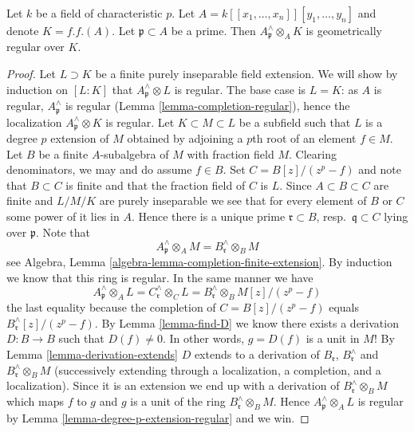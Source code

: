 \begin{lemma}
\label{lemma-helper-G-ring}
Let $k$ be a field of characteristic $p$.
Let $A = k[[x_1, \ldots, x_n]][y_1, \ldots, y_n]$ and denote $K = f.f.(A)$.
Let $\mathfrak p \subset A$ be a prime. Then
$A_\mathfrak p^\wedge \otimes_A K$ is geometrically regular over $K$.
\end{lemma}

\begin{proof}
Let $L \supset K$ be a finite purely inseparable field extension.
We will show by induction on $[L : K]$ that $A_\mathfrak p^\wedge \otimes L$
is regular. The base case is $L = K$: as $A$ is regular,
$A_\mathfrak p^\wedge$ is regular (Lemma \ref{lemma-completion-regular}),
hence the localization $A_\mathfrak p^\wedge \otimes K$ is regular.
Let $K \subset M \subset L$ be a subfield such that
$L$ is a degree $p$ extension of $M$ obtained by adjoining a $p$th root
of an element $f \in M$. Let $B$ be a finite $A$-subalgebra
of $M$ with fraction field $M$. Clearing denominators, we may and do assume
$f \in B$. Set $C = B[z]/(z^p -f)$ and note that $B \subset C$
is finite and that the fraction field of $C$ is $L$. Since
$A \subset B \subset C$ are finite and $L/M/K$ are purely
inseparable we see that for every element of $B$ or $C$ some power of
it lies in $A$. Hence there is a unique prime $\mathfrak r \subset B$,
resp.\ $\mathfrak q \subset C$ lying over $\mathfrak p$. Note that
$$
A_\mathfrak p^\wedge \otimes_A M = B_\mathfrak r^\wedge \otimes_B M
$$
see Algebra, Lemma \ref{algebra-lemma-completion-finite-extension}.
By induction we know that this ring is regular. In the same manner we have
$$
A_\mathfrak p^\wedge \otimes_A L =
C_\mathfrak r^\wedge \otimes_C L =
B_\mathfrak r^\wedge \otimes_B M[z]/(z^p - f)
$$
the last equality because the completion of
$C = B[z]/(z^p - f)$ equals $B_\mathfrak r^\wedge[z]/(z^p -f)$.
By Lemma \ref{lemma-find-D} we know there exists a derivation
$D : B \to B$ such that $D(f) \not = 0$. In other words, $g = D(f)$
is a unit in $M$! By Lemma \ref{lemma-derivation-extends}
$D$ extends to a derivation of $B_\mathfrak r$, $B_\mathfrak r^\wedge$
and $B_\mathfrak r^\wedge \otimes_B M$ (successively extending through a
localization, a completion, and a localization). Since it is an
extension we end up with a derivation of $B_\mathfrak r^\wedge \otimes_B M$
which maps $f$ to $g$ and $g$ is a unit of the ring
$B_\mathfrak r^\wedge \otimes_B M$.
Hence $A_\mathfrak p^\wedge \otimes_A L$ is regular by
Lemma \ref{lemma-degree-p-extension-regular} and we win.
\end{proof}

